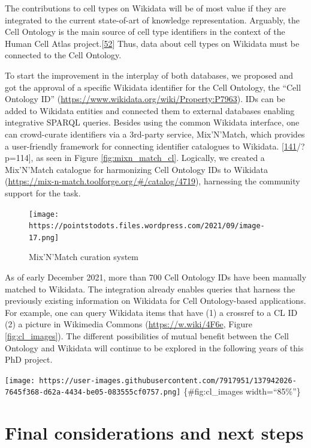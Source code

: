 The contributions to cell types on Wikidata will be of most value if they are integrated to the current state-of-art of knowledge representation.
Arguably, the Cell Ontology is the main source of cell type identifiers in the context of the Human Cell Atlas project.{[}\protect\hyperlink{ref-qT8WxqjA}{52}{]}
Thus, data about cell types on Wikidata must be connected to the Cell Ontology.

To start the improvement in the interplay of both databases, we proposed and got the approval of a specific Wikidata identifier for the Cell Ontology, the ``Cell Ontology ID'' (\url{https://www.wikidata.org/wiki/Property:P7963}).
IDs can be added to Wikidata entities and connected them to external databases enabling integrative SPARQL queries.
Besides using the common Wikidata interface, one can crowd-curate identifiers via a 3rd-party service, Mix'N'Match, which provides a user-friendly framework for connecting identifier catalogues to Wikidata. {[}\protect\hyperlink{ref-JgiKEEdq}{141}/?p=114{]}, as seen in Figure \ref{fig:mixn_match_cl}.
Logically, we created a Mix'N'Match catalogue for harmonizing Cell Ontology IDs to Wikidata (\url{https://mix-n-match.toolforge.org/\#/catalog/4719}), harnessing the community support for the task.

\begin{figure}
\hypertarget{fig:mixnmatch_cl}{%
\centering
\texttt{[image: https://pointstodots.files.wordpress.com/2021/09/image-17.png]}
\caption{Mix'N'Match curation system}\label{fig:mixnmatch_cl}
}
\end{figure}

As of early December 2021, more than 700 Cell Ontology IDs have been manually matched to Wikidata.
The integration already enables queries that harness the previously existing information on Wikidata for Cell Ontology-based applications.
For example, one can query Wikidata items that have (1) a crossref to a CL ID (2) a picture in Wikimedia Commons (\url{https://w.wiki/4F6e}, Figure \ref{fig:cl_images}).
The different possibilities of mutual benefit between the Cell Ontology and Wikidata will continue to be explored in the following years of this PhD project.

\texttt{[image: https://user-images.githubusercontent.com/7917951/137942026-7645f368-d62a-4434-be05-083555cf0757.png]} \{\#fig:cl\_images width=``85\%''\}

\hypertarget{final-considerations-and-next-steps}{%
\section{Final considerations and next steps}\label{final-considerations-and-next-steps}}

